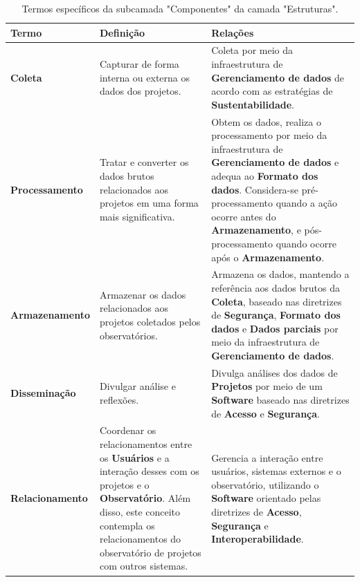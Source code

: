 \begin{apendicesenv}
\begin{table}[H]
\centering
\caption{Termos específicos da subcamada "Componentes" da camada "Estruturas".}
\begin{tabularx}{\textwidth}{|l|X|X|}
\hline
\textbf{Termo} & \textbf{Definição} & \textbf{Relações} \\ \hline
\textbf{Coleta} & Capturar de forma interna ou externa os dados dos projetos. & Coleta por meio da infraestrutura de \textbf{Gerenciamento de dados} de acordo com as estratégias de \textbf{Sustentabilidade}. \\ \hline
\textbf{Processamento} & Tratar e converter  os dados brutos relacionados aos projetos em uma forma mais significativa. & Obtem os dados, realiza o processamento por meio da infraestrutura de \textbf{Gerenciamento de dados} e adequa ao \textbf{Formato dos dados}. Considera-se pré-processamento quando a ação ocorre antes do \textbf{Armazenamento}, e pós-processamento quando ocorre após o \textbf{Armazenamento}.\\ \hline
\textbf{Armazenamento}  & Armazenar os dados relacionados aos projetos coletados pelos observatórios. & Armazena os dados, mantendo a referência aos dados brutos da \textbf{Coleta}, baseado nas diretrizes de \textbf{Segurança}, \textbf{Formato dos dados} e \textbf{Dados parciais} por meio da infraestrutura de \textbf{Gerenciamento de dados}.\\ \hline
\textbf{Disseminação}  & Divulgar análise e reflexões. & Divulga análises dos dados de \textbf{Projetos} por meio de um \textbf{Software} baseado nas diretrizes de \textbf{Acesso} e \textbf{Segurança}.\\ \hline
\textbf{Relacionamento}  & Coordenar os relacionamentos entre os \textbf{Usuários} e a interação desses com os projetos e o \textbf{Observatório}. Além disso, este conceito contempla os relacionamentos do observatório de projetos com outros sistemas. & Gerencia a interação entre usuários, sistemas externos e o observatório, utilizando o \textbf{Software} orientado pelas diretrizes de \textbf{Acesso}, \textbf{Segurança} e \textbf{Interoperabilidade}.\\ \hline
\end{tabularx}
\end{table}


\end{apendicesenv}
